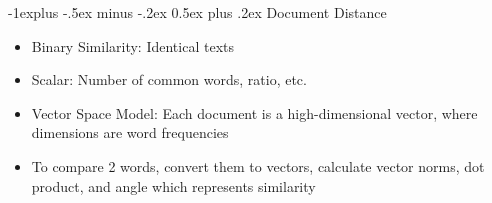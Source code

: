 \documentclass[10pt, landscape]{article}
\makeatletter
\renewcommand{\section}{\@startsection{section}{1}{0mm}%
                                {-1ex plus -.5ex minus -.2ex}%
                                {0.5ex plus .2ex}%
                                {\normalfont\large\bfseries}}
\renewcommand{\section}{\@startsection{section}{2}{0mm}%
                                {-1explus -.5ex minus -.2ex}%
                                {0.5ex plus .2ex}%
                                {\normalfont\normalsize\bfseries}}
\makeatother
\begin{document}
\raggedright
\footnotesize
\begin{multicols*}{4}

\setlength{\columnseprule}{0.25pt}
\setlength{\premulticols}{1pt}
\setlength{\postmulticols}{1pt}
\setlength{\multicolsep}{1pt}
\setlength{\columnsep}{2pt}

\begin{center}
\end{center}

\section{Document Distance}
\begin{itemize}
    \item Binary Similarity: Identical texts
    \item Scalar: Number of common words, ratio, etc.
    \item Vector Space Model: Each document is a high-dimensional vector, where dimensions are word frequencies
    \item  To compare 2 words, convert them to vectors, calculate vector norms, dot product, and angle which represents similarity
\end{itemize}


\end{multicols*}
\end{document}
